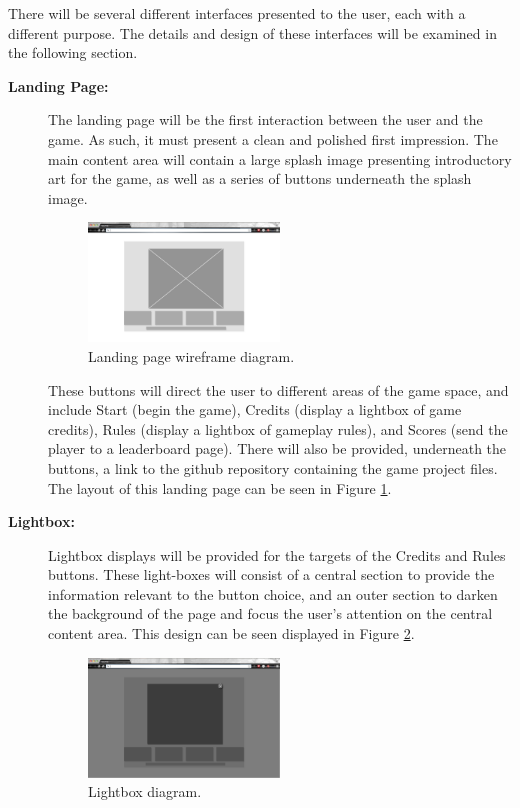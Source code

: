 \documentclass[12pt]{IEEEtran}
\begin{document}
	There will be several different interfaces presented to the user, each with a different purpose. The details and design of these interfaces will be examined in the following section. 
	
	\begin{description}
	\item[\textbf{Landing Page:}] \hspace{4em} The landing page will be the first interaction between the user and the game. As such, it must present a clean and polished first impression. The main content area will contain a large splash image presenting introductory art for the game, as well as a series of buttons underneath the splash image.
	
	\begin{figure}[h]
		\centering
		\includegraphics[width=0.5\textwidth]{1_IntroPage.jpg}
		\caption{Landing page wireframe diagram. }
		\label{fig:landingpagewireframe}
	\end{figure}
	
	These buttons will direct the user to different areas of the game space, and include Start (begin the game), Credits (display a lightbox of game credits), Rules (display a lightbox of gameplay rules), and Scores (send the player to a leaderboard page). There will also be provided, underneath the buttons, a link to the github repository containing the game project files. The layout of this landing page can be seen in 	Figure \ref{fig:landingpagewireframe}.
	
	\item[\textbf{Lightbox:}] \hspace{2em} Lightbox displays will be provided for the targets of the Credits and Rules buttons. These light-boxes will consist of a central section to provide the information relevant to the button choice, and an outer section to darken the background of the page and focus the user’s attention on the central content area. This design can be seen displayed in Figure \ref{fig:lightbox}. 
	
	\begin{figure}[h]
		\centering
		\includegraphics[width=0.5\textwidth]{2_rulesCreditsScoresLightbox.jpg}
		\caption{Lightbox diagram. }
		\label{fig:lightbox}
	\end{figure}
	

\end{description}
\end{document}
